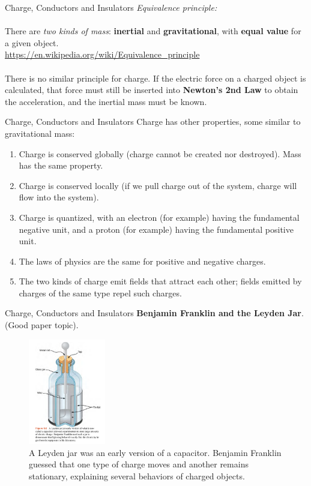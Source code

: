 \documentclass{beamer}
\begin{document}
\begin{frame}{Charge, Conductors and Insulators}
\small
\textit{Equivalence principle:} \\ \hrulefill \\
There are \textit{two kinds of mass}: \textbf{inertial} and \textbf{gravitational}, with \textbf{equal value} for a given object. \\ \vspace{0.5cm}
\url{https://en.wikipedia.org/wiki/Equivalence_principle} \\
\hrulefill \\
There is no similar principle for charge.  If the electric force on a charged object is calculated, that force must still be inserted into \textbf{Newton's 2nd Law} to obtain the acceleration, and the inertial mass must be known.
\end{frame}

\begin{frame}{Charge, Conductors and Insulators}
\small
Charge has other properties, some similar to gravitational mass: \\ \vspace{0.25cm}
\begin{enumerate}
\item Charge is conserved globally (charge cannot be created nor destroyed).  Mass has the same property.
\item Charge is conserved locally (if we pull charge out of the system, charge will flow into the system).
\item Charge is quantized, with an electron (for example) having the fundamental negative unit, and a proton (for example) having the fundamental positive unit.
\item The laws of physics are the same for positive and negative charges.
\item The two kinds of charge emit fields that attract each other; fields emitted by charges of the same type repel such charges.
\end{enumerate}
\end{frame}

\begin{frame}{Charge, Conductors and Insulators}
\textbf{Benjamin Franklin and the Leyden Jar}.  (Good paper topic).
\begin{figure}
\centering
\includegraphics[width=0.3\textwidth]{figures/leyden.png}
\caption{\label{fig:leyden} A Leyden jar was an early version of a capacitor.  Benjamin Franklin guessed that one type of charge moves and another remains stationary, explaining several behaviors of charged objects.}
\end{figure}
\end{frame}
\end{document}
